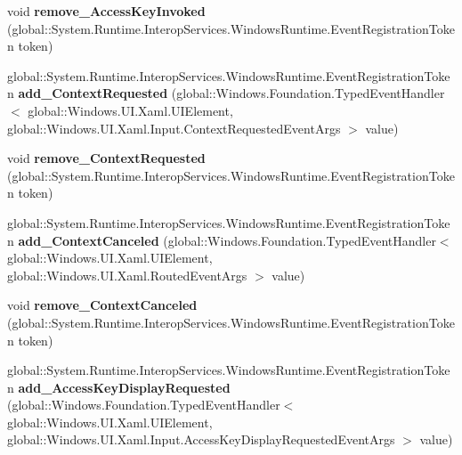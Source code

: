 \begin{DoxyCompactItemize}
void {\bfseries remove\+\_\+\+Access\+Key\+Invoked} (global\+::\+System.\+Runtime.\+Interop\+Services.\+Windows\+Runtime.\+Event\+Registration\+Token token)
\item 
\mbox{\label{interface_windows_1_1_u_i_1_1_xaml_1_1_i_u_i_element4_abe904f042597f814b0e82b6911018524}} 
global\+::\+System.\+Runtime.\+Interop\+Services.\+Windows\+Runtime.\+Event\+Registration\+Token {\bfseries add\+\_\+\+Context\+Requested} (global\+::\+Windows.\+Foundation.\+Typed\+Event\+Handler$<$ global\+::\+Windows.\+U\+I.\+Xaml.\+U\+I\+Element, global\+::\+Windows.\+U\+I.\+Xaml.\+Input.\+Context\+Requested\+Event\+Args $>$ value)
\item 
\mbox{\label{interface_windows_1_1_u_i_1_1_xaml_1_1_i_u_i_element4_abdaa8213b321663c768808ee50570eb8}} 
void {\bfseries remove\+\_\+\+Context\+Requested} (global\+::\+System.\+Runtime.\+Interop\+Services.\+Windows\+Runtime.\+Event\+Registration\+Token token)
\item 
\mbox{\label{interface_windows_1_1_u_i_1_1_xaml_1_1_i_u_i_element4_a9ade4191c6e4d4e8692b363604d2e6cf}} 
global\+::\+System.\+Runtime.\+Interop\+Services.\+Windows\+Runtime.\+Event\+Registration\+Token {\bfseries add\+\_\+\+Context\+Canceled} (global\+::\+Windows.\+Foundation.\+Typed\+Event\+Handler$<$ global\+::\+Windows.\+U\+I.\+Xaml.\+U\+I\+Element, global\+::\+Windows.\+U\+I.\+Xaml.\+Routed\+Event\+Args $>$ value)
\item 
\mbox{\label{interface_windows_1_1_u_i_1_1_xaml_1_1_i_u_i_element4_ac9d7657d497cc4bd420335a23752824f}} 
void {\bfseries remove\+\_\+\+Context\+Canceled} (global\+::\+System.\+Runtime.\+Interop\+Services.\+Windows\+Runtime.\+Event\+Registration\+Token token)
\item 
\mbox{\label{interface_windows_1_1_u_i_1_1_xaml_1_1_i_u_i_element4_a35fc44f1af8aacfcb2a3ff829fcb7d50}} 
global\+::\+System.\+Runtime.\+Interop\+Services.\+Windows\+Runtime.\+Event\+Registration\+Token {\bfseries add\+\_\+\+Access\+Key\+Display\+Requested} (global\+::\+Windows.\+Foundation.\+Typed\+Event\+Handler$<$ global\+::\+Windows.\+U\+I.\+Xaml.\+U\+I\+Element, global\+::\+Windows.\+U\+I.\+Xaml.\+Input.\+Access\+Key\+Display\+Requested\+Event\+Args $>$ value)

\end{DoxyCompactItemize}
